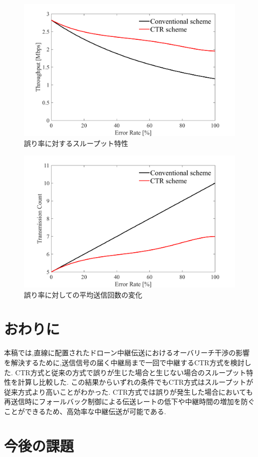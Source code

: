 \documentclass[a4paper,10.5pt]{ltjsarticle}
\begin{document}
\begin{figure}[H]
  \centering
  \includegraphics[width=\linewidth]{throughput_probabilistic_retry_v3.pdf} %
  \caption{誤り率に対するスループット特性}
  \label{fig:throughput_v3} %
\end{figure}
\begin{figure}[H]
  \centering
  \includegraphics[width=\linewidth]{throughput_probabilistic_retry_v3.1.pdf} %
  \caption{誤り率に対しての平均送信回数の変化}
  \label{fig:throughput_v3.1} %
\end{figure}
\clearpage

\section{おわりに}
本稿では,直線に配置されたドローン中継伝送におけるオーバリーチ干渉の影響を解決するために,送信信号の届く中継局まで一回で中継するCTR方式を検討した.
CTR方式と従来の方式で誤りが生じた場合と生じない場合のスループット特性を計算し比較した.
この結果からいずれの条件でもCTR方式はスループットが従来方式より高いことがわかった.
CTR方式では誤りが発生した場合においても再送信時にフォールバック制御による伝送レートの低下や中継時間の増加を防ぐことができるため、高効率な中継伝送が可能である.
\clearpage
\section{今後の課題}
\end{document}
